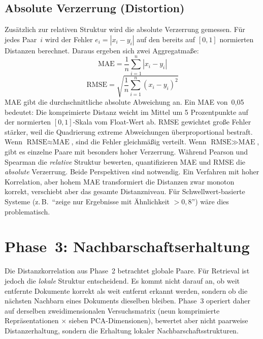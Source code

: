 \subsection{Absolute Verzerrung (Distortion)}
%
Zusätzlich zur relativen Struktur wird die absolute Verzerrung gemessen.
Für jedes Paar~$i$ wird der Fehler $e_i = |x_i - y_i|$ auf den bereits auf $[0, 1]$ normierten Distanzen berechnet.
Daraus ergeben sich zwei Aggregatmaße:
%
\begin{equation}
  \text{MAE} = \frac{1}{n}\sum_{i=1}^{n} |x_i - y_i|
  \label{eq:mae}
\end{equation}
%
\begin{equation}
  \text{RMSE} = \sqrt{\frac{1}{n}\sum_{i=1}^{n} (x_i - y_i)^2}
  \label{eq:rmse}
\end{equation}
%
MAE gibt die durchschnittliche absolute Abweichung an.
Ein MAE von~0{,}05 bedeutet: Die komprimierte Distanz weicht im Mittel um 5 Prozentpunkte auf der normierten $[0, 1]$-Skala vom Float-Wert ab.
RMSE gewichtet große Fehler stärker, weil die Quadrierung extreme Abweichungen überproportional bestraft.
Wenn $\text{RMSE} \approx \text{MAE}$, sind die Fehler gleichmäßig verteilt.
Wenn $\text{RMSE} \gg \text{MAE}$, gibt es einzelne Paare mit besonders hoher Verzerrung.
%
Während Pearson und Spearman die \emph{relative} Struktur bewerten, quantifizieren MAE und RMSE die \emph{absolute} Verzerrung.
Beide Perspektiven sind notwendig.
Ein Verfahren mit hoher Korrelation, aber hohem MAE transformiert die Distanzen zwar monoton korrekt, verschiebt aber das gesamte Distanzniveau.
Für Schwellwert-basierte Systeme (z.\,B.\ ``zeige nur Ergebnisse mit Ähnlichkeit $> 0{,}8$'') wäre dies problematisch.
%
\section{Phase~3: Nachbarschaftserhaltung}
\label{sec:methodik_phase3}
%
Die Distanzkorrelation aus Phase~2 betrachtet globale Paare.
Für Retrieval ist jedoch die \emph{lokale} Struktur entscheidend.
Es kommt nicht darauf an, ob weit entfernte Dokumente korrekt als weit entfernt erkannt werden, sondern ob die nächsten Nachbarn eines Dokuments dieselben bleiben.
Phase~3 operiert daher auf derselben zweidimensionalen Versuchsmatrix (neun komprimierte Repräsentationen $\times$ sieben PCA-Dimensionen), bewertet aber nicht paarweise Distanzerhaltung, sondern die Erhaltung lokaler Nachbarschaftsstrukturen.
%
